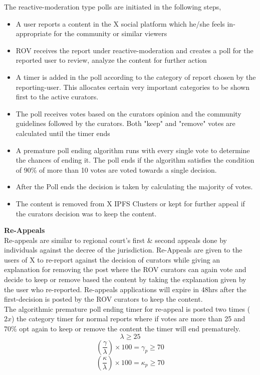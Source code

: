\documentclass[letterpaper,11pt]{article}
\begin{document}
The reactive-moderation type polls are initiated  in the following steps,
\begin{itemize}[wide, labelwidth=!, labelindent=0pt]
\item A user reports a content in the X social platform which he/she feels in-appropriate for the community or similar viewers
\item ROV receives the report under reactive-moderation and creates a poll for the reported user to review, analyze the content for further action
\item A timer is added in the poll according to the category of report chosen by the reporting-user.  This allocates certain very important categories to be shown first to the active curators.
\item The poll receives votes based on the curators opinion and the community guidelines followed by the curators. Both "keep" and "remove" votes are calculated until the timer ends
\item A premature poll ending algorithm runs with every single vote to determine the chances of ending it.  The poll ends if the algorithm satisfies the condition of 90\% of more than 10 votes are voted towards a single decision.
\item After the Poll ends the decision is taken by calculating the majority of votes. 
\item The content is removed from X IPFS Clusters or kept for further appeal if the curators decision was to keep the content.
\end{itemize}


\textbf{Re-Appeals}\\

Re-appeals are similar to regional court's first \& second appeals done by individuals against the decree of the jurisdiction.  Re-Appeals are given to the users of X to re-report against the decision of curators while giving an explanation for removing the post where the ROV curators can again vote and decide to keep or remove based the content by taking the explanation given by the user who re-reported. Re-appeals applications will expire in 48hrs after the first-decision is posted by the ROV curators to keep the content. \\

The algorithmic premature poll ending timer for re-appeal is posted two times ($2x$) the category timer for normal reports where if votes are more than 25 and 70\% opt again to keep or remove the content the timer will end prematurely.\\
\[\lambda \geq25\]
\[(\frac{\gamma}{\lambda}) \times  100 = \gamma_p \geq 70\]
\[(\frac{\kappa}{\lambda}) \times  100 = \kappa_p \geq 70\]
\end{document}
